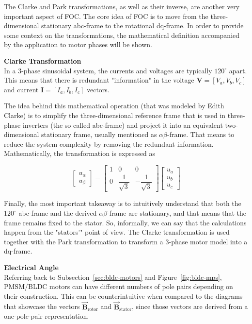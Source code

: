 The Clarke and Park transformations, as well as their inverse, are another very important aspect of FOC. The core idea of FOC is to move from the three-dimensional stationary abc-frame to the rotational dq-frame. In order to provide some context on the transformations, the mathematical definition accompanied by the application to motor phases will be shown.

\textbf{Clarke Transformation} \\
In a 3-phase sinusoidal system, the currents and voltages are typically $120^\circ$ apart. This means that there is redundant "information" in the voltage $\textbf{V} = \left[V_a, V_b, V_c\right]$ and current $\textbf{I} = \left[I_a, I_b, I_c\right]$ vectors. 

The idea behind this mathematical operation (that was modeled by Edith Clarke) is to simplify the three-dimensional reference frame that is used in three-phase inverters (the so called abc-frame) and project it into an equivalent two-dimensional stationary frame, usually mentioned as $\alpha\beta$-frame. That means to reduce the system complexity by removing the redundant information. Mathematically, the transformation is expressed as

\begin{equation}
    \begin{bmatrix} u_\alpha \\ u_\beta \end{bmatrix}
    =
    \begin{bmatrix} 1 & 0 & 0 \\ 0 & \dfrac{1}{\sqrt{3}} & -\dfrac{1}{\sqrt{3}} \end{bmatrix}
    \begin{bmatrix} u_a \\ u_b \\ u_c \end{bmatrix}
    \label{eq:clarke-matrix}
\end{equation}

Finally, the most important takeaway is to intuitively understand that both the $120^\circ$ abc-frame and the derived $\alpha\beta$-frame are stationary, and that means that the frame remains fixed to the stator. So, informally, we can say that the calculations happen from the "stators'" point of view. The Clarke transformation is used together with the Park transformation to transform a 3-phase motor model into a dq-frame.

\textbf{Electrical Angle} \\
Referring back to Subsection~\ref{sec:bldc-motors} and Figure~\ref{fig:bldc-mps}, PMSM/BLDC motors can have different numbers of pole pairs depending on their construction. This can be counterintuitive when compared to the diagrams that showcase the vectors $\boldsymbol{\vec{B}}_{\text{rotor}}$ and $\boldsymbol{\vec{B}}_{\text{stator}}$, since those vectors are derived from a one-pole-pair representation.

